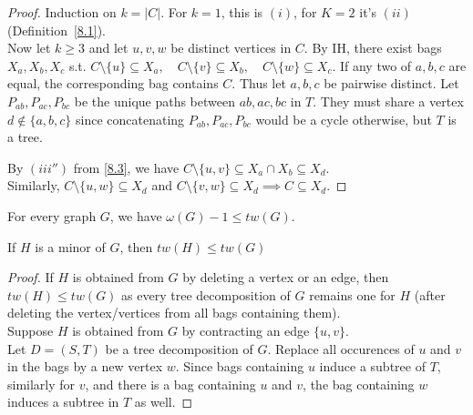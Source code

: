 \begin{proof}
    Induction on $k=|C|$. For $k=1$, this is $(i)$, for $K=2$ it's $(ii)$ (Definition~\ref{8.1}).\\
    Now let $k\geq 3$ and let $u,v,w$ be distinct vertices in $C$. By IH, there exist bags $X_a,X_b,X_c$ s.t. $C\setminus\{u\}\subseteq X_a,\quad C\setminus\{v\}\subseteq X_b,\quad C\setminus\{w\}\subseteq X_c$. If any two of $a,b,c$ are equal, the corresponding bag contains $C$. Thus let $a,b,c$ be pairwise distinct. Let $P_{ab},P_{ac},P_{bc}$ be the unique paths between $ab,ac,bc$ in $T$. They must share a vertex $d\notin\{a,b,c\}$ since concatenating $P_{ab},P_{ac},P_{bc}$ would be a cycle otherwise, but $T$ is a tree.
     \begin{center}
    \end{center}
    By $(iii'')$ from \ref{8.3}, we have $C\setminus\{u,v\}\subseteq X_a\cap X_b\subseteq X_d$.\\
    Similarly, $C\setminus\{u,w\}\subseteq X_d$ and $C\setminus\{v,w\}\subseteq X_d\implies C\subseteq X_d$.
\end{proof}
\begin{corollary}\label{8.5}
    For every graph $G$, we have $\omega(G)-1\leq tw(G)$.
\end{corollary}
\begin{lemma}\label{8.6}
    If $H$ is a minor of $G$, then $tw(H)\leq tw(G)$
\end{lemma}
\begin{proof}
    If $H$ is obtained from $G$ by deleting a vertex or an edge, then $tw(H)\leq tw(G)$ as every tree decomposition of $G$ remains one for $H$ (after deleting the vertex/vertices from all bags containing them).\\
    Suppose $H$ is obtained from $G$ by contracting an edge $\{u,v\}$.\\
    Let $D=(S,T)$ be a tree decomposition of $G$. Replace all occurences of $u$ and $v$ in the bags by a new vertex $w$. Since bags containing $u$ induce a subtree of $T$, similarly for $v$, and there is a bag containing $u$ and $v$, the bag containing $w$ induces a subtree in $T$ as well.
\end{proof}
